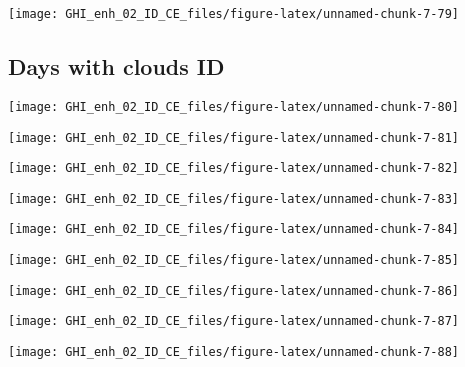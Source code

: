 \documentclass[
  10pt,
  a4paper,oneside]{article}
\begin{document}
\begin{center}\texttt{[image: GHI\_enh\_02\_ID\_CE\_files/figure-latex/unnamed-chunk-7-79]} \end{center}

\FloatBarrier

\hypertarget{days-with-clouds-id}{%
\subsection{Days with clouds ID}\label{days-with-clouds-id}}

\begin{center}\texttt{[image: GHI\_enh\_02\_ID\_CE\_files/figure-latex/unnamed-chunk-7-80]} \end{center}

\begin{center}\texttt{[image: GHI\_enh\_02\_ID\_CE\_files/figure-latex/unnamed-chunk-7-81]} \end{center}

\begin{center}\texttt{[image: GHI\_enh\_02\_ID\_CE\_files/figure-latex/unnamed-chunk-7-82]} \end{center}

\begin{center}\texttt{[image: GHI\_enh\_02\_ID\_CE\_files/figure-latex/unnamed-chunk-7-83]} \end{center}

\begin{center}\texttt{[image: GHI\_enh\_02\_ID\_CE\_files/figure-latex/unnamed-chunk-7-84]} \end{center}

\begin{center}\texttt{[image: GHI\_enh\_02\_ID\_CE\_files/figure-latex/unnamed-chunk-7-85]} \end{center}

\begin{center}\texttt{[image: GHI\_enh\_02\_ID\_CE\_files/figure-latex/unnamed-chunk-7-86]} \end{center}

\begin{center}\texttt{[image: GHI\_enh\_02\_ID\_CE\_files/figure-latex/unnamed-chunk-7-87]} \end{center}

\begin{center}\texttt{[image: GHI\_enh\_02\_ID\_CE\_files/figure-latex/unnamed-chunk-7-88]} \end{center}
\end{document}

